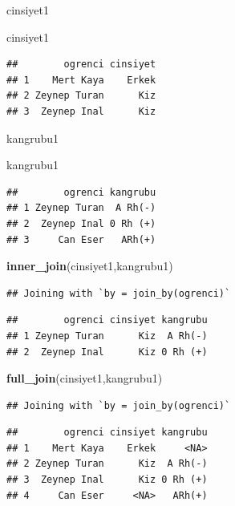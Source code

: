 \documentclass[
  oneside]{book}
\newenvironment{Shaded}{\begin{snugshade}}{\end{snugshade}}
\newcommand{\FunctionTok}[1]{\textcolor[rgb]{0.13,0.29,0.53}{\textbf{#1}}}
\newcommand{\NormalTok}[1]{#1}
\begin{document}
cinsiyet1

\begin{Shaded}
\begin{Highlighting}[]
\NormalTok{cinsiyet1}
\end{Highlighting}
\end{Shaded}

\begin{verbatim}
##        ogrenci cinsiyet
## 1    Mert Kaya    Erkek
## 2 Zeynep Turan      Kiz
## 3  Zeynep Inal      Kiz
\end{verbatim}

kangrubu1

\begin{Shaded}
\begin{Highlighting}[]
\NormalTok{kangrubu1}
\end{Highlighting}
\end{Shaded}

\begin{verbatim}
##        ogrenci kangrubu
## 1 Zeynep Turan  A Rh(-)
## 2  Zeynep Inal 0 Rh (+)
## 3     Can Eser   ARh(+)
\end{verbatim}

\begin{Shaded}
\begin{Highlighting}[]
\FunctionTok{inner\_join}\NormalTok{(cinsiyet1,kangrubu1)}
\end{Highlighting}
\end{Shaded}

\begin{verbatim}
## Joining with `by = join_by(ogrenci)`
\end{verbatim}

\begin{verbatim}
##        ogrenci cinsiyet kangrubu
## 1 Zeynep Turan      Kiz  A Rh(-)
## 2  Zeynep Inal      Kiz 0 Rh (+)
\end{verbatim}

\begin{Shaded}
\begin{Highlighting}[]
\FunctionTok{full\_join}\NormalTok{(cinsiyet1,kangrubu1)}
\end{Highlighting}
\end{Shaded}

\begin{verbatim}
## Joining with `by = join_by(ogrenci)`
\end{verbatim}

\begin{verbatim}
##        ogrenci cinsiyet kangrubu
## 1    Mert Kaya    Erkek     <NA>
## 2 Zeynep Turan      Kiz  A Rh(-)
## 3  Zeynep Inal      Kiz 0 Rh (+)
## 4     Can Eser     <NA>   ARh(+)
\end{verbatim}
\end{document}
